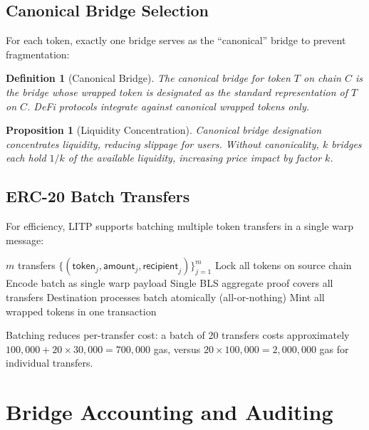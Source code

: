 \documentclass[11pt,a4paper]{article}
\newtheorem{proposition}[theorem]{Proposition}
\newtheorem{definition}{Definition}
\begin{document}
\subsection{Canonical Bridge Selection}

For each token, exactly one bridge serves as the ``canonical'' bridge to prevent fragmentation:

\begin{definition}[Canonical Bridge]
The canonical bridge for token $T$ on chain $C$ is the bridge whose wrapped token is designated as the standard representation of $T$ on $C$. DeFi protocols integrate against canonical wrapped tokens only.
\end{definition}

\begin{proposition}[Liquidity Concentration]
Canonical bridge designation concentrates liquidity, reducing slippage for users. Without canonicality, $k$ bridges each hold $1/k$ of the available liquidity, increasing price impact by factor $k$.
\end{proposition}

\subsection{ERC-20 Batch Transfers}

For efficiency, LITP supports batching multiple token transfers in a single warp message:

\begin{algorithm}[H]
\caption{Batch Token Transfer}
\label{alg:batch}
\begin{algorithmic}[1]
\Require $m$ transfers $\{(\mathsf{token}_j, \mathsf{amount}_j, \mathsf{recipient}_j)\}_{j=1}^m$
\State Lock all tokens on source chain
\State Encode batch as single warp payload
\State Single BLS aggregate proof covers all transfers
\State Destination processes batch atomically (all-or-nothing)
\State Mint all wrapped tokens in one transaction
\end{algorithmic}
\end{algorithm}

Batching reduces per-transfer cost: a batch of 20 transfers costs approximately $100{,}000 + 20 \times 30{,}000 = 700{,}000$ gas, versus $20 \times 100{,}000 = 2{,}000{,}000$ gas for individual transfers.

\section{Bridge Accounting and Auditing}\label{sec:audit}
\end{document}
